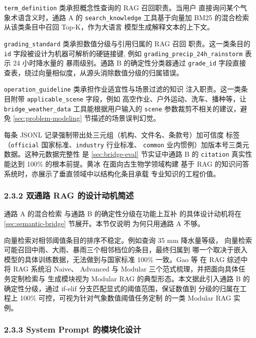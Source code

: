 \texttt{term\_\bk{}definition} 类承担概念性查询的 RAG 召回职责。当用户
直接询问某个气象术语含义时，通路 A 的 \texttt{search\_\bk{}knowledge}
工具基于向量加 BM25 的混合检索从该类条目中召回 Top-K，作为大语言
模型生成解释文本的上下文。

\texttt{grading\_\bk{}standard} 类承担数值分级与引用归属的 RAG 召回
职责。这一类条目的 \texttt{id} 字段被设计为机器可解析的硬链接键,
例如 \texttt{grading\_\bk{}precip\_\bk{}24h\_\bk{}rainstorm} 表示 24 小时降水量的
暴雨级别。通路 B 的确定性分类器通过 \texttt{grade\_\bk{}id} 字段直接
查表，绕过向量相似度，从源头消除数值分级的归属错误。

\texttt{operation\_\bk{}guideline} 类承担作业适宜性与场景过滤的知识
注入职责。这一类条目附带 \texttt{applicable\_\bk{}scene} 字段，例如
高空作业、户外运动、洗车、播种等，让 \texttt{bridge\_\bk{}weather\_\bk{}data}
工具能根据用户输入的 \texttt{scene} 参数裁剪不相关的建议，避免
\ref{sec:problem-modeling} 节描述的场景误判幻觉。

每条 JSONL 记录强制带出处三元组（机构、文件名、条款号）加可信度
标签（\texttt{official} 国家标准、\texttt{industry} 行业标准、
\texttt{common} 业内惯例）加版本号三类元数据。这种元数据完整性
是 \ref{sec:bridge-eval} 节实证中通路 B 的 \texttt{citation} 真实性
能达到 100\% 的根本前提。黄冰 \cite{ref4} 在面向古生物学领域构建
基于 RAG 的知识问答系统时，亦展示了垂直领域中以结构化条目承载
专业知识的工程价值。

\subsubsection*{2.3.2 \quad 双通路 RAG 的设计动机简述}

通路 A 的混合检索 \cite{ref12} 与通路 B 的确定性分级在功能上互补
的具体设计动机将在 \ref{sec:semantic-bridge} 节展开。本节仅说明
为何只用通路 A 不够。

向量检索对相邻阈值条目的排序不稳定。例如查询 35 mm 降水量等级，
向量检索可能召回中雨、大雨、暴雨三个相邻档位的条目，最终归属到
哪一个取决于嵌入模型的具体训练数据，无法做到与国家标准 100\%
一致。Gao 等 \cite{ref24} 在 RAG 综述中将 RAG 系统沿 Naive、
Advanced 与 Modular 三个范式梳理，并把面向具体任务定制检索与
生成模块视为 Modular RAG 的典型形态。本文据此引入通路 B 的
确定性分级，通过 if-elif 分支匹配显式的阈值范围，保证数值到
分级的归属在工程上 100\% 可控，可视为针对气象数值阈值任务定制
的一类 Modular RAG 实例。

\subsubsection*{2.3.3 \quad System Prompt 的模块化设计}

